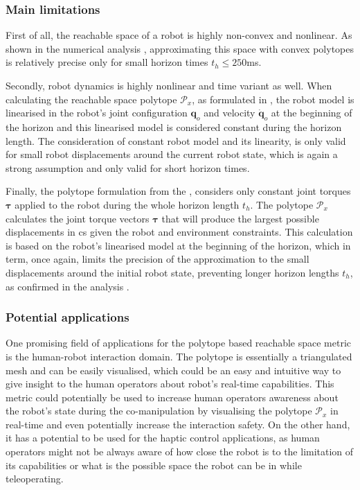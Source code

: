 \subsubsection{Main limitations }

First of all, the reachable space of a robot is highly non-convex and nonlinear. As shown in the numerical analysis , approximating this space with convex polytopes is relatively precise only for small horizon times $t_h\leq250$ms.

Secondly, robot dynamics is highly nonlinear and time variant as well. When calculating the reachable space polytope $\mathcal{P}_x$, as formulated in , the robot model is linearised in the robot's joint configuration $\bm{q}_o$ and velocity $\dot{\bm{q}}_o$  at the beginning of the horizon and this linearised model is considered constant during the horizon length. The consideration of constant robot model and its linearity, is only valid for small robot displacements around the current robot %
state, which is again a strong assumption and only valid for short horizon times. 

Finally, the polytope formulation from the , considers only constant joint torques $\bm{\tau}$ applied to the robot during the whole horizon length $t_h$. The polytope $\mathcal{P}_x$ calculates the joint torque vectors $\bm{\tau}$ that will produce the largest possible displacements in \gls{cs} given the robot and environment constraints. This calculation is based on the robot's linearised model at the beginning of the horizon, which in term, once again, limits the precision of the approximation to the small displacements around the initial robot state, preventing longer horizon lengths $t_h$, as confirmed in the analysis .



\subsubsection{Potential applications}

One promising field of applications for the polytope based reachable space metric is the human-robot interaction domain. The polytope is essentially a triangulated mesh and can be easily visualised, which could be an easy and intuitive way to give insight to the human operators about robot's real-time capabilities. This metric could potentially be used to increase human operators awareness about the robot's state during the co-manipulation by visualising the polytope $\mathcal{P}_x$ in real-time and even potentially increase the interaction safety. On the other hand, it has a potential to be used for the haptic control applications, as human operators might not be always aware of how close the robot is to the limitation of its capabilities or what is the possible space the robot can be in while teleoperating. 

